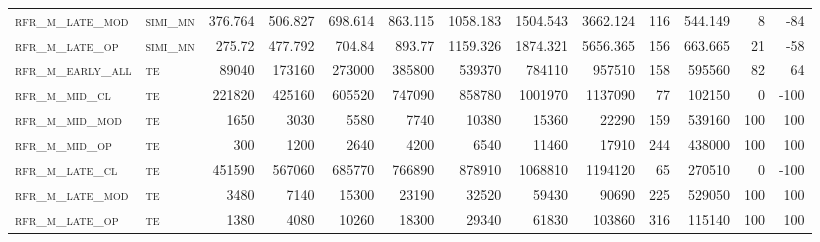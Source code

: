 \begin{landscape}
\begin{center}
\begin{footnotesize}
\begin{longtable}{llrrrrrrrr|rrr}
\textsc{rfr\_m\_late\_mod } & \textsc{simi\_mn  }   & 376.764 & 506.827 & 698.614 & 863.115  & 1058.183 & 1504.543 & 3662.124 & 116    & 544.149       & 8             & -84             \\
\textsc{rfr\_m\_late\_op  } & \textsc{simi\_mn  }   & 275.72  & 477.792 & 704.84  & 893.77   & 1159.326 & 1874.321 & 5656.365 & 156    & 663.665       & 21            & -58             \\
\textsc{rfr\_m\_early\_all} & \textsc{te  	    }   & 89040   & 173160  & 273000  & 385800   & 539370   & 784110   & 957510   & 158    & 595560        & 82            & 64              \\
\textsc{rfr\_m\_mid\_cl   } & \textsc{te        }   & 221820  & 425160  & 605520  & 747090   & 858780   & 1001970  & 1137090  & 77     & 102150        & 0             & -100            \\
\textsc{rfr\_m\_mid\_mod  } & \textsc{te        }   & 1650    & 3030    & 5580    & 7740     & 10380    & 15360    & 22290    & 159    & 539160        & 100           & 100             \\
\textsc{rfr\_m\_mid\_op   } & \textsc{te        }   & 300     & 1200    & 2640    & 4200     & 6540     & 11460    & 17910    & 244    & 438000        & 100           & 100             \\
\textsc{rfr\_m\_late\_cl  } & \textsc{te        }   & 451590  & 567060  & 685770  & 766890   & 878910   & 1068810  & 1194120  & 65     & 270510        & 0             & -100            \\
\textsc{rfr\_m\_late\_mod } & \textsc{te        }   & 3480    & 7140    & 15300   & 23190    & 32520    & 59430    & 90690    & 225    & 529050        & 100           & 100             \\
\textsc{rfr\_m\_late\_op  } & \textsc{te        }   & 1380    & 4080    & 10260   & 18300    & 29340    & 61830    & 103860   & 316    & 115140        & 100           & 100            


\end{longtable}
\end{footnotesize}
\end{center}
\end{landscape}

\restoregeometry
\pagestyle{headings}


